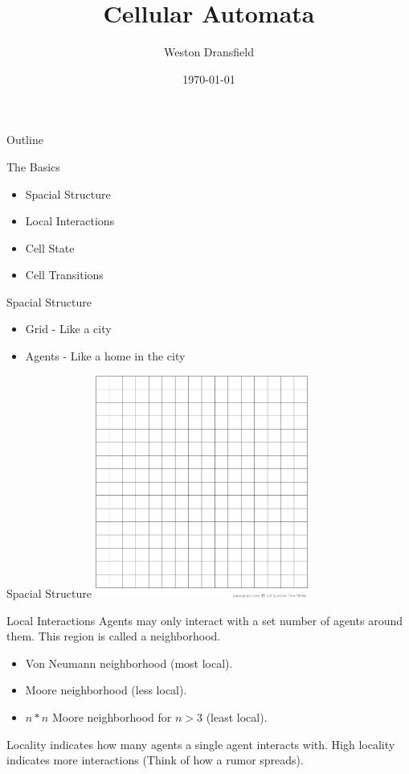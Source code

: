 \documentclass[bigger]{beamer}
\author{Weston Dransfield}
\date{\today}
\title{Cellular Automata}
\begin{document}
\maketitle
\begin{frame}{Outline}
\tableofcontents
\end{frame}


\begin{frame}[label=sec-1]{The Basics}
\begin{itemize}
\item<1-> Spacial Structure
\item<2-> Local Interactions
\item<3-> Cell State
\item<4-> Cell Transitions
\end{itemize}
\end{frame}

\begin{frame}[label=sec-2]{Spacial Structure}
\begin{itemize}
\item<1-> Grid - Like a city
\item<2-> Agents - Like a home in the city
\end{itemize}
\end{frame}

\begin{frame}[label=sec-3]{Spacial Structure}
\includegraphics[width=7cm]{images/grid.png}
\end{frame}

\begin{frame}[label=sec-4]{Local Interactions}
Agents may only interact with a set number of agents around them. This region is called a neighborhood.
\begin{itemize}
\item<1->Von Neumann neighborhood (most local).
\item<2->Moore neighborhood (less local).
\item<3->\(n*n\) Moore neighborhood for \(n > 3\) (least local).
\end{itemize}
\pause
\pause
\pause
Locality indicates how many agents a single agent interacts with. High locality indicates more interactions (Think of how a rumor spreads).
\end{frame}
\end{document}
